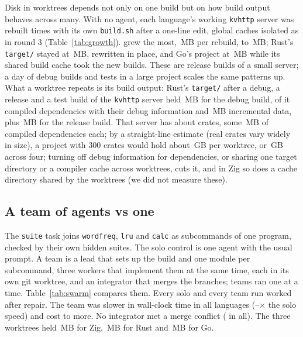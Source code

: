 \documentclass[11pt,a4paper]{article}
\begin{document}
Disk in worktrees depends not only on one build but on how build output behaves across many. With no
agent, each language's working \texttt{kvhttp} server was rebuilt \GrowthCycles{} times with its own
\texttt{build.sh} after a one-line edit, global caches isolated as in round 3 (Table~\ref{tab:growth}).
\GrowthTopLang{} grew the most, \GrowthTopPerBuild\,MB per rebuild, to \GrowthTopFinal\,MB; Rust's
\texttt{target/} stayed at \GrowthRustFinal\,MB, rewritten in place, and Go's project at
\GrowthGoFinal\,MB while its shared build cache took the new builds. These are release builds of a small
server; a day of debug builds and tests in a large project scales the same patterns up. What a worktree
repeats is its build output: Rust's \texttt{target/} after a debug, a release and a test build of the
\texttt{kvhttp} server held \RustTargetDebug\,MB for the debug build, \RustTargetDepsShare{} of it compiled
dependencies with their debug information and \RustTargetIncremental\,MB incremental data, plus
\RustTargetRelease\,MB for the release build. That server has about \RustTargetCrates{} crates, some
\RustPerCrate\,MB of compiled dependencies each; by a straight-line estimate (real crates vary widely in
size), a project with 300 crates would hold about \RustThreeHundred\,GB per worktree, or
\RustThreeHundredFour\,GB across four; turning
off debug information for dependencies, or sharing one target directory or a compiler cache across
worktrees, cuts it, and in Zig so does a cache directory shared by the worktrees (we did not measure these).

\begin{table}[h]
\centering\small
\caption{The \texttt{kvhttp} solution rebuilt after a one-line edit, \GrowthCycles{} times. MB: the
project's build output after the first build and after the last; per rebuild: their difference divided by
the rebuilds; global caches: package and build caches outside the project, shared by every worktree.}
\label{tab:growth}
\GrowthTable
\end{table}

\subsection{A team of agents vs one}

The \texttt{suite} task joins \texttt{wordfreq}, \texttt{lru} and \texttt{calc} as subcommands of one
program, checked by their own hidden suites. The solo control is one agent with the usual prompt. A team is
a lead that sets up the build and one module per subcommand, three workers that implement them at the same
time, each in its own git worktree, and an integrator that merges the branches; teams ran one at a time.
Table~\ref{tab:swarm} compares them. Every solo and every team run worked after repair. The team was slower
in wall-clock time in all \NSwarmLangs{} languages (\SwarmSpeedMin--\SwarmSpeedMax$\times$ the solo
speed) and cost \SwarmCostMin{} to \SwarmCostMax{} more. No integrator met a merge conflict
(\SwarmConflicts{} in all). The three worktrees held \SwarmDiskZig\,MB for Zig, \SwarmDiskRust\,MB for
Rust and \SwarmDiskGo\,MB for Go.
\end{document}
